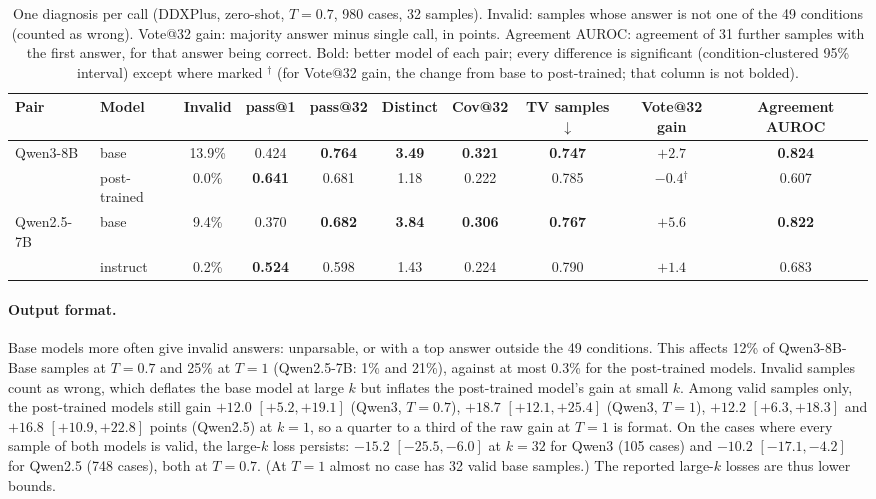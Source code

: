 \documentclass[11pt]{article}
\begin{document}
\begin{table}[t]
\centering\small
\setlength{\tabcolsep}{3.5pt}
\begin{adjustbox}{max width=\linewidth}
\begin{tabular}{llcccccccc}
\toprule
Pair & Model & Invalid & pass@1 & pass@32 & Distinct & Cov@32 & TV samples$\downarrow$ & Vote@32 gain & Agreement AUROC \\
\midrule
Qwen3-8B & base & 13.9\% & 0.424 & \textbf{0.764} & \textbf{3.49} & \textbf{0.321} & \textbf{0.747} & $+2.7$ & \textbf{0.824} \\
 & post-trained & 0.0\% & \textbf{0.641} & 0.681 & 1.18 & 0.222 & 0.785 & $-0.4$$^{\dagger}$ & 0.607 \\
Qwen2.5-7B & base & 9.4\% & 0.370 & \textbf{0.682} & \textbf{3.84} & \textbf{0.306} & \textbf{0.767} & $+5.6$ & \textbf{0.822} \\
 & instruct & 0.2\% & \textbf{0.524} & 0.598 & 1.43 & 0.224 & 0.790 & $+1.4$ & 0.683 \\
\bottomrule
\end{tabular}
\end{adjustbox}
\caption{One diagnosis per call (DDXPlus, zero-shot, $T{=}0.7$, 980 cases, 32 samples). Invalid: samples whose answer is not one of the 49 conditions (counted as wrong). Vote@32 gain: majority answer minus single call, in points. Agreement AUROC: agreement of 31 further samples with the first answer, for that answer being correct. Bold: better model of each pair; every difference is significant (condition-clustered 95\% interval) except where marked $^{\dagger}$ (for Vote@32 gain, the change from base to post-trained; that column is not bolded).}
\label{tab:single}
\end{table}

\paragraph{Output format.} Base models more often give invalid answers: unparsable, or with a top answer outside the 49 conditions. This affects 12\% of Qwen3-8B-Base samples at $T{=}0.7$ and 25\% at $T{=}1$ (Qwen2.5-7B: 1\% and 21\%), against at most 0.3\% for the post-trained models.
Invalid samples count as wrong, which deflates the base model at large $k$ but inflates the post-trained model's gain at small $k$.
Among valid samples only, the post-trained models still gain $+12.0$ $[+5.2,+19.1]$ (Qwen3, $T{=}0.7$), $+18.7$ $[+12.1,+25.4]$ (Qwen3, $T{=}1$), $+12.2$ $[+6.3,+18.3]$ and $+16.8$ $[+10.9,+22.8]$ points (Qwen2.5) at $k{=}1$, so a quarter to a third of the raw gain at $T{=}1$ is format.
On the cases where every sample of both models is valid, the large-$k$ loss persists: $-15.2$ $[-25.5,-6.0]$ at $k{=}32$ for Qwen3 (105 cases) and $-10.2$ $[-17.1,-4.2]$ for Qwen2.5 (748 cases), both at $T{=}0.7$. (At $T{=}1$ almost no case has 32 valid base samples.) The reported large-$k$ losses are thus lower bounds.
\end{document}
